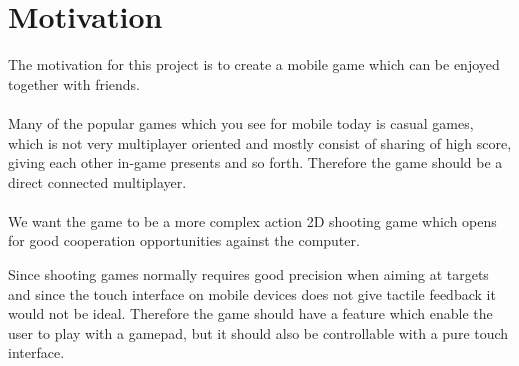 \section{Motivation} \label{sec:motivation}
The motivation for this project is to create a mobile game which can be enjoyed together with friends.\\\\
Many of the popular games which you see for mobile today is casual games, which is not very multiplayer oriented and mostly consist of sharing of high score, giving each other in-game presents and so forth.
Therefore the game should be a direct connected multiplayer.\\\\
We want the game to be a more complex action 2D shooting game which opens for good cooperation opportunities against the computer.

Since shooting games normally requires good precision when aiming at targets and since the touch interface on mobile devices does not give tactile feedback it would not be ideal. Therefore the game should have a feature which enable the user to play with a gamepad, but it should also be controllable with a pure touch interface.\\\\
